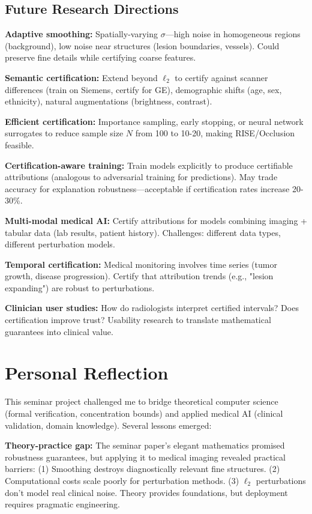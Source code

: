 \documentclass[11pt]{article}
\begin{document}
\subsection{Future Research Directions}

\textbf{Adaptive smoothing:} Spatially-varying $\sigma$—high noise in homogeneous regions (background), low noise near structures (lesion boundaries, vessels). Could preserve fine details while certifying coarse features.

\textbf{Semantic certification:} Extend beyond $\ell_2$ to certify against scanner differences (train on Siemens, certify for GE), demographic shifts (age, sex, ethnicity), natural augmentations (brightness, contrast).

\textbf{Efficient certification:} Importance sampling, early stopping, or neural network surrogates to reduce sample size $N$ from 100 to 10-20, making RISE/Occlusion feasible.

\textbf{Certification-aware training:} Train models explicitly to produce certifiable attributions (analogous to adversarial training for predictions). May trade accuracy for explanation robustness—acceptable if certification rates increase 20-30\%.

\textbf{Multi-modal medical AI:} Certify attributions for models combining imaging + tabular data (lab results, patient history). Challenges: different data types, different perturbation models.

\textbf{Temporal certification:} Medical monitoring involves time series (tumor growth, disease progression). Certify that attribution trends (e.g., "lesion expanding") are robust to perturbations.

\textbf{Clinician user studies:} How do radiologists interpret certified intervals? Does certification improve trust? Usability research to translate mathematical guarantees into clinical value.


\section{Personal Reflection}

This seminar project challenged me to bridge theoretical computer science (formal verification, concentration bounds) and applied medical AI (clinical validation, domain knowledge). Several lessons emerged:

\textbf{Theory-practice gap:} The seminar paper's elegant mathematics promised robustness guarantees, but applying it to medical imaging revealed practical barriers: (1) Smoothing destroys diagnostically relevant fine structures. (2) Computational costs scale poorly for perturbation methods. (3) $\ell_2$ perturbations don't model real clinical noise. Theory provides foundations, but deployment requires pragmatic engineering.
\end{document}
